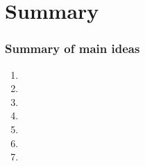 \documentclass[11pt,containsverbatim,handout,xcolor=xelatex,dvipsnames,table]{beamer}
\begin{document}

\section{Summary}


\begin{frame}
\frametitle{Summary of main ideas}

\vfill

\begin{enumerate}

\item {}

\item {}

\item {}

\item {}

\item {}

\item {}

\item {}

\end{enumerate}

\vfill

\end{frame}

\end{document}
